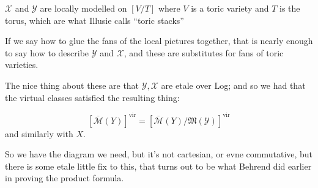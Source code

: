 \documentclass{amsart}
\theoremstyle{definition}
\newcommand{\Mbar}{\overline{\mathcal{M}}}
\newcommand{\vir}{\text{vir}}
\begin{document}
$\mathcal{X}$ and $\mathcal{Y}$ are locally modelled on $[V/T]$ where $V$ is a toric variety and $T$ is the torus, which are what Illusie calls ``toric stacks''

If we say how to glue the fans of the local pictures together, that is nearly enough to say how to describe $\mathcal{Y}$ and $\mathcal{X}$, and these are substitutes for fans of toric varieties.

The nice thing about these are that $\mathcal{Y},\mathcal{X}$ are etale over Log; and so we had that the virtual classes satisfied the resulting thing:

$$[\Mbar(Y)]^\vir=[\Mbar(Y)/\mathfrak{M}(\mathcal{Y})]^\vir$$
and similarly with $X$.

So we have the diagram we need, but it's not cartesian, or evne commutative, but there is some etale little fix to this, that turns out to be what Behrend did earlier in proving the product formula.
\end{document}
